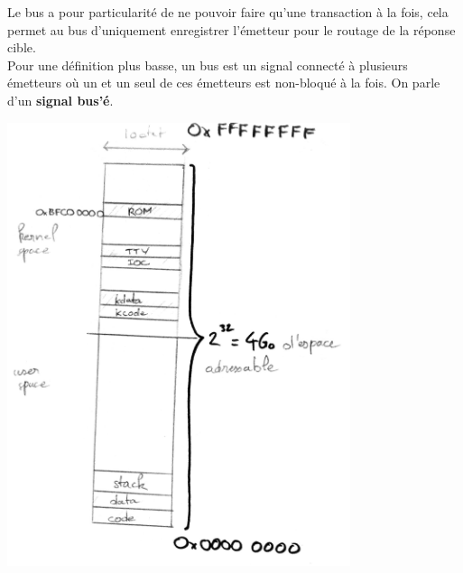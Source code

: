 Le bus a pour particularité de ne pouvoir faire qu'une transaction à la fois, cela
permet au bus d'uniquement enregistrer l'émetteur pour le routage de la réponse
cible.\\

Pour une définition plus basse, un bus est un signal connecté à plusieurs émetteurs où
un et un seul de ces émetteurs est non-bloqué à la fois. On parle d'un {\bf signal
bus'é}.
\begin{center}
  \includegraphics[height=13cm]{cours2/pics/mem.jpg}\\
\end{center}
